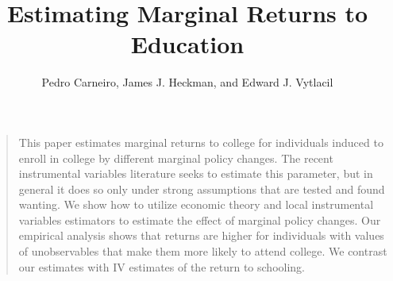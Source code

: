

\title{Estimating Marginal Returns to Education}
\author{Pedro Carneiro, James J. Heckman, and Edward J. Vytlacil}

\date{}

\let\otp\titlepage


\nobibliography*
\maketitle

 \begin{frame}
\begin{quote} This paper estimates marginal returns to college for individuals induced to enroll in college by different marginal policy changes. The recent instrumental variables literature seeks to estimate this parameter, but in general it does so only under strong assumptions that are tested and found wanting. We show how to utilize economic theory and local instrumental variables estimators to estimate the effect of marginal policy changes. Our empirical analysis shows that returns are higher for individuals with values of unobservables that make them more likely to attend college. We contrast our estimates with IV estimates of the return to schooling.
\end{quote}
 \end{frame}


\begin{frame}\begin{center}\begin{figure}[htp]\centering
{}
\end{figure}\end{center}\end{frame}

\begin{frame}\begin{center}\begin{figure}[htp]\centering
{}
\end{figure}\end{center}\end{frame}

\begin{frame}\begin{center}\begin{figure}[htp]\centering
{}
\end{figure}\end{center}\end{frame}



